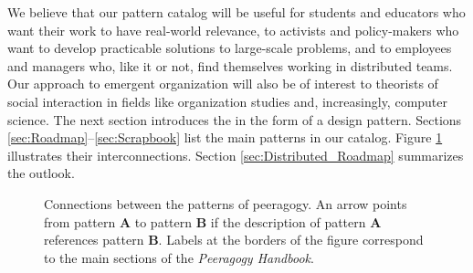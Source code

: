 \begin{center}

\end{center}

We believe that our pattern catalog will be useful for students and educators who want their work to have real-world relevance, to activists and policy-makers who want to develop practicable solutions to large-scale problems, and to employees and managers who, like it or not, find themselves working in distributed teams.   Our approach to emergent organization will also be of interest to theorists of social interaction in fields like organization studies and, increasingly, computer science.  The next section introduces the  in the form of a design pattern.  Sections \ref{sec:Roadmap}--\ref{sec:Scrapbook} list the main patterns in our catalog.    Figure \ref{fig:connections} illustrates their interconnections.  Section \ref{sec:Distributed_Roadmap} summarizes the outlook.

\begin{figure}
\vspace{-.9in}
{\centering


\par
}
\vspace{-.9in}
\caption{Connections between the patterns of peeragogy.  An arrow points from pattern \textbf{A} to pattern \textbf{B} if the description of pattern \textbf{A} references pattern \textbf{B}. Labels at the borders of the figure correspond to the main sections of the \emph{Peeragogy Handbook}.\label{fig:connections}}
\end{figure}

